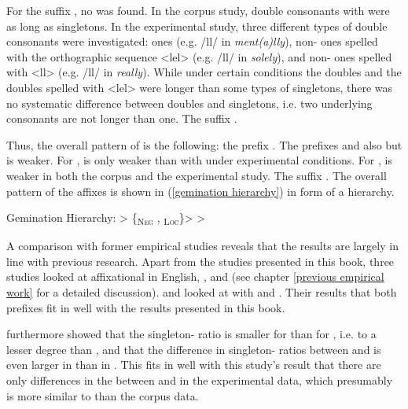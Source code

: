 For the suffix , no  was found. In the corpus study, double consonants with  were as long as singletons. In the experimental study, three different types of double consonants were investigated:  ones (e.g. /ll/ in  \textit{ment(a)lly}), non- ones spelled with the orthographic sequence <lel> (e.g. /ll/ in \textit{solely}), and non- ones spelled with <ll> (e.g. /ll/ in \textit{really}). While under certain conditions the  doubles and the doubles spelled with <lel> were longer than some types of singletons, there was no systematic difference between doubles and singletons, i.e. two underlying consonants are not longer than one. The suffix  .



Thus, the overall pattern of  is the following: the prefix  . The prefixes  and   also  but  is weaker. For ,  is only weaker than  with  under experimental conditions. For ,  is weaker in both the corpus and the experimental study. The suffix  . The overall  pattern of the affixes is shown in (\ref{gemination hierarchy}) in form of a hierarchy.


\begin{exe}
	
	\ex \label{gemination hierarchy} {Gemination Hierarchy}: \hspace*{0.5cm}	{ > \{\textsubscript{\textsc{Neg}} ,  \textsubscript{\textsc{Loc}}\}>  > }
	
\end{exe}


A comparison with former empirical studies reveals that the results are largely in line with previous research. 
Apart from the studies presented in this book, three studies looked at affixational  in English, \cite{Kaye.2005}, \cite{Oh.2012} and \cite{Kotzor.2016} (see chapter \ref{previous empirical work} for a detailed discussion). 
\cite{Kaye.2005} and \cite{Oh.2012} looked at  with  and . Their results that both prefixes  fit in well with the results presented in this book.

\cite{Oh.2012} furthermore showed that the singleton- ratio is smaller for  than for , i.e.   to a lesser degree than , and that the difference in singleton- ratios between  and  is even larger in  than in . 
This fits in well with this study's result that there are only differences in the  between  and  in the experimental data, which presumably is more similar to  than the corpus data.

